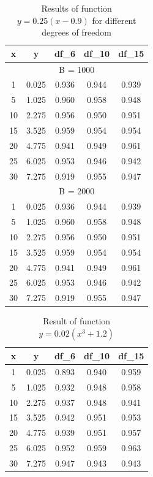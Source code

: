 \documentclass[12pt]{article}
\begin{document}
\begin{table}[ht]
  \centering
  \caption{Results of function \(y = 0.25(x - 0.9)\) for different degrees of freedom}
  \begin{tabular}{|c|c|c|c|c|}
    \hline
    \textbf{x} & \textbf{y} & \textbf{df\_6} & \textbf{df\_10} & \textbf{df\_15} \\
    \hline
    \multicolumn{5}{|c|}{B = 1000} \\
    \hline
    1 & 0.025 & 0.936 & 0.944 & 0.939 \\
    \hline
    5 & 1.025 & 0.960 & 0.958 & 0.948 \\
    \hline
    10 & 2.275 & 0.956 & 0.950 & 0.951 \\
    \hline
    15 & 3.525 & 0.959 & 0.954 & 0.954 \\
    \hline
    20 & 4.775 & 0.941 & 0.949 & 0.961 \\
    \hline
    25 & 6.025 & 0.953 & 0.946 & 0.942 \\
    \hline
    30 & 7.275 & 0.919 & 0.955 & 0.947 \\
    \hline
    \multicolumn{5}{|c|}{B = 2000} \\
    \hline
    1 & 0.025 & 0.936 & 0.944 & 0.939 \\
    \hline
    5 & 1.025 & 0.960 & 0.958 & 0.948 \\
    \hline
    10 & 2.275 & 0.956 & 0.950 & 0.951 \\
    \hline
    15 & 3.525 & 0.959 & 0.954 & 0.954 \\
    \hline
    20 & 4.775 & 0.941 & 0.949 & 0.961 \\
    \hline
    25 & 6.025 & 0.953 & 0.946 & 0.942 \\
    \hline
    30 & 7.275 & 0.919 & 0.955 & 0.947 \\
    \hline
  \end{tabular}
\end{table}



\begin{table}[ht]
  \centering
  \caption{Result of function  \(y = 0.02(x^3+1.2)\)}
\begin{tabular}{|c|c|c|c|c|}
    \hline
\textbf{x} & \textbf{y} & \textbf{df\_6} & \textbf{df\_10} & \textbf{df\_15} \\
    \hline
    1 & 0.025 & 0.893 & 0.940 & 0.959 \\
    \hline
    5 & 1.025 & 0.932 & 0.948 & 0.958 \\
    \hline
    10 & 2.275 & 0.937 & 0.948 & 0.941 \\
    \hline
    15 & 3.525 & 0.942 & 0.951 & 0.953 \\
    \hline
    20 & 4.775 & 0.939 & 0.951 & 0.957 \\
    \hline
    25 & 6.025 & 0.952 & 0.959 & 0.963 \\
    \hline
    30 & 7.275 & 0.947 & 0.943 & 0.943 \\
    \hline
  \end{tabular}
\end{table}
\end{document}
